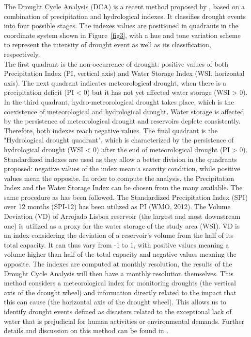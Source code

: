 \documentclass[draft]{agujournal2019}
\begin{document}
The Drought Cycle Analysis (DCA) is a recent method proposed by , based on a combination of precipitation and hydrological indexes. It classifies drought events into four possible stages. The indexes values are positioned in quadrants in the coordinate system shown in Figure~\ref{fig3}, with a hue and tone variation scheme to represent the intensity of drought event as well as its classification, respectively.\\
The first quadrant is the non-occurrence of drought: positive values of both Precipitation Index (PI, vertical axis) and Water Storage Index (WSI, horizontal axis). The next quadrant indicates meteorological drought, when there is a precipitation deficit (PI < 0) but it has not yet affected water storage (WSI > 0). In the third quadrant, hydro-meteorological drought takes place, which is the coexistence of meteorological and hydrological drought. Water storage is affected by the persistence of meteorological drought and reservoirs deplete consistently. Therefore, both indexes reach negative values. The final quadrant is the "Hydrological drought quadrant", which is characterized by the persistence of hydrological drought (WSI < 0) after the end of meteorological drought (PI > 0).\\
Standardized indexes are used as they allow a better division in the quadrants proposed: negative values of the index mean a scarcity condition, while positive values mean the opposite. In order to compute the analysis, the Precipitation Index and the Water Storage Index can be chosen from the many available. The same procedure as  has been followed. The Standardized Precipitation Index (SPI) over 12 months (SPI-12) has been utilized as PI (WMO, 2012). The Volume Deviation (VD) of Arrojado Lisboa reservoir (the largest and most downstream one) is utilized as a proxy for the water storage of the study area (WSI). VD is an index considering the deviation of a reservoir’s volume from the half of its total capacity. It can thus vary from -1 to 1, with positive values meaning a volume higher than half of the total capacity and negative values meaning the opposite. The indexes are computed at monthly resolution, the results of the Drought Cycle Analysis will then have a monthly resolution themselves. This method considers a meteorological index for monitoring droughts (the vertical axis of the drought wheel) and information directly related to the impact that this can cause (the horizontal axis of the drought wheel). This allows us to identify drought events defined as disasters related to the exceptional lack of water that is prejudicial for human activities or environmental demands. Further details and discussion on this method can be found in .
\end{document}

